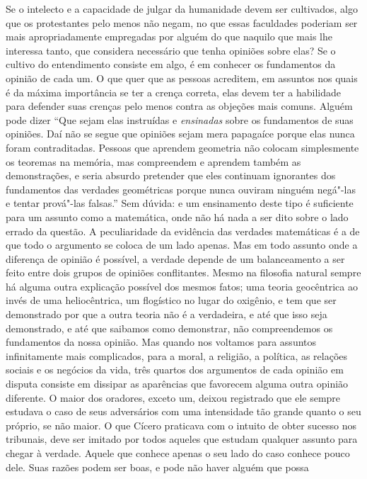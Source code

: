 Se o intelecto e a capacidade de julgar da humanidade devem ser cultivados, algo que
os protestantes pelo menos não negam, no que essas faculdades poderiam
ser mais apropriadamente empregadas por alguém do que naquilo que mais
lhe interessa tanto, que considera necessário que tenha opiniões sobre
elas? Se o cultivo do entendimento consiste em algo, é em conhecer 
os fundamentos da opinião de cada um. O que quer que as
pessoas acreditem, em assuntos nos quais é da máxima importância se ter
a crença correta, elas devem ter a habilidade para defender suas
crenças pelo menos contra as objeções mais comuns. Alguém pode dizer
``Que sejam elas instruídas e \textit{ensinadas} sobre os fundamentos de suas
opiniões. Daí não se segue que opiniões sejam mera papagaíce porque
elas nunca foram contraditadas. Pessoas que aprendem geometria não
colocam simplesmente os teoremas na memória, mas compreendem e aprendem
também as demonstrações, e seria absurdo pretender que eles continuam
ignorantes dos fundamentos das verdades geométricas porque nunca
ouviram ninguém negá"-las e tentar prová"-las falsas.'' Sem dúvida: e
um ensinamento deste tipo é suficiente para um assunto como a
matemática, onde não há nada a ser dito sobre o lado errado da questão.
A peculiaridade da evidência das verdades matemáticas é a de que todo o
argumento se coloca de um lado apenas. Mas em todo assunto onde a
diferença de opinião é possível, a verdade depende de um balanceamento
a ser feito entre dois grupos de opiniões conflitantes. Mesmo na
filosofia natural sempre há alguma outra explicação possível dos mesmos
fatos; uma teoria geocêntrica ao invés de uma heliocêntrica, um
flogístico no lugar do oxigênio, e tem que ser demonstrado por que a
outra teoria não é a verdadeira, e até que isso seja demonstrado, e até
que saibamos como demonstrar, não compreendemos os fundamentos da nossa
opinião. Mas quando nos voltamos para assuntos infinitamente mais
complicados, para a moral, a religião, a política, as relações
sociais e os negócios da vida, três quartos dos argumentos de cada
opinião em disputa consiste em dissipar as aparências que favorecem
alguma outra opinião diferente. O maior dos oradores, exceto um, deixou
registrado que ele sempre estudava o caso de seus adversários com uma
intensidade tão grande quanto o seu próprio, se não maior. O que
Cícero praticava com o intuito de obter sucesso nos tribunais, deve ser
imitado por todos aqueles que estudam qualquer assunto para chegar à
verdade. Aquele que conhece apenas o seu lado do caso conhece pouco
dele. Suas razões podem ser boas, e pode não haver alguém que possa
